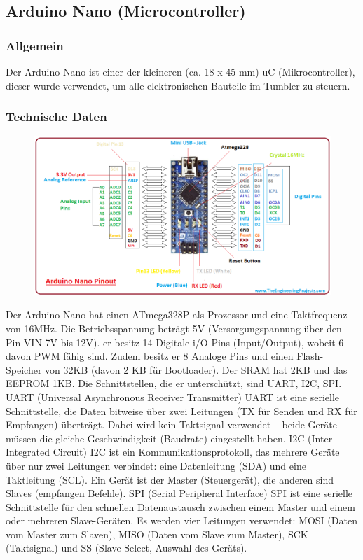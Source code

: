 \subsection{Arduino Nano (Microcontroller)}
%
\subsubsection{Allgemein}
Der Arduino Nano ist einer der kleineren (ca. 18 x 45 mm) uC (Mikrocontroller), dieser wurde verwendet, um alle elektronischen Bauteile im Tumbler zu steuern.
\subsubsection{Technische Daten}
\begin{figure}[H]
    \includegraphics[width=1\textwidth, center]{img/Hardware/arduino_nano.png}
\end{figure}
Der Arduino Nano hat einen ATmega328P als Prozessor und eine Taktfrequenz von 16MHz. Die Betriebsspannung beträgt 5V (Versorgungspannung über den Pin VIN 7V bis 12V). 
er besitz 14 Digitale i/O Pins (Input/Output), wobeit 6 davon PWM fähig sind. Zudem besitz er 8 Analoge Pins und einen Flash-Speicher von 32KB (davon 2 KB für Bootloader). 
Der SRAM hat 2KB und das EEPROM 1KB. Die Schnittstellen, die er unterschützt, sind UART, I2C, SPI.
UART (Universal Asynchronous Receiver Transmitter)
UART ist eine serielle Schnittstelle, die Daten bitweise über zwei Leitungen (TX für Senden und RX für Empfangen) überträgt. 
Dabei wird kein Taktsignal verwendet – beide Geräte müssen die gleiche Geschwindigkeit (Baudrate) eingestellt haben.
I2C (Inter-Integrated Circuit)
I2C ist ein Kommunikationsprotokoll, das mehrere Geräte über nur zwei Leitungen verbindet: eine Datenleitung (SDA) und eine Taktleitung (SCL). 
Ein Gerät ist der Master (Steuergerät), die anderen sind Slaves (empfangen Befehle).
SPI (Serial Peripheral Interface)
SPI ist eine serielle Schnittstelle für den schnellen Datenaustausch zwischen einem Master und einem oder mehreren Slave-Geräten. 
Es werden vier Leitungen verwendet: MOSI (Daten vom Master zum Slaven), MISO (Daten vom Slave zum Master), SCK (Taktsignal) und SS (Slave Select, Auswahl des Geräts).
